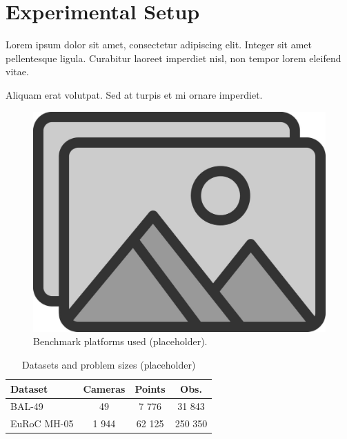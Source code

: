 \section{Experimental Setup}
Lorem ipsum dolor sit amet, consectetur adipiscing elit. Integer sit amet
pellentesque ligula. Curabitur laoreet imperdiet nisl, non tempor lorem
eleifend vitae.

Aliquam erat volutpat. Sed at turpis et mi ornare imperdiet.

\begin{figure}[t]
  \centering
  \includegraphics[width=0.8\linewidth]{figs/placeholder}
  \caption{Benchmark platforms used (placeholder).}
  \label{fig:exp_platforms}
\end{figure}

\begin{table}[b]
  \caption{Datasets and problem sizes (placeholder)}
  \label{tab:exp_datasets}
  \centering
  \begin{tabular}{@{}lccc@{}}
    \toprule
    Dataset & Cameras & Points & Obs. \\ \midrule
    BAL-49 & 49 & 7 776 & 31 843 \\
    EuRoC MH-05 & 1 944 & 62 125 & 250 350 \\ \bottomrule
  \end{tabular}
\end{table}
